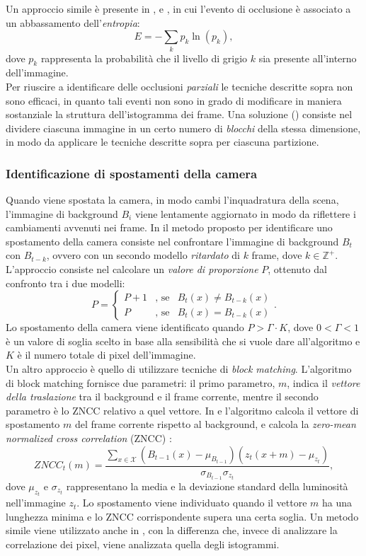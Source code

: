 Un approccio simile \`e presente in \cite{harasse2004automated}, \cite{gil2007automatic} e \cite{ellwart2012camera}, in cui l'evento di occlusione \`e associato a un abbassamento dell'\textit{entropia}:
 \[
 \label{eq:entropy}
 E=-\sum_{k}p_k\ln(p_k) ,
 \]
 dove $p_k$ rappresenta la probabilit\`a che il livello di grigio $k$ sia presente all'interno dell'immagine. \\
 Per riuscire a identificare delle occlusioni \textit{parziali} le tecniche descritte sopra non sono efficaci, in quanto tali eventi non sono in grado di modificare in maniera sostanziale la struttura dell'istogramma dei frame.
 Una soluzione (\cite{gil2007automatic}) consiste nel dividere ciascuna immagine in un certo numero di \textit{blocchi} della stessa dimensione, in modo da applicare le tecniche descritte sopra per ciascuna partizione.
\subsubsection{Identificazione di spostamenti della camera}
Quando viene spostata la camera, in modo cambi l'inquadratura della scena, l'immagine di background $B_i$ viene lentamente aggiornato in modo da riflettere i cambiamenti avvenuti nei frame. 
In \cite{saglam2009real} il metodo proposto per identificare uno spostamento della camera consiste nel confrontare l'immagine di background $B_t$ con $B_{t-k}$, ovvero con un secondo modello \textit{ritardato} di $k$ frame, dove $k \in \mathbb{Z}^+$.
L'approccio consiste nel calcolare un \textit{valore di proporzione} $P$, ottenuto dal confronto tra i due modelli:
\[
\label{eq:displEqSaglam}
P=\left\{ \begin{array} {lcl}
P+1 & \mbox{, se} & B_t(x) \neq B_{t-k}(x) \\
P & \mbox{, se} & B_t(x) = B_{t-k}(x) \end{array} \right. .
\]
Lo spostamento della camera viene identificato quando $P > \Gamma \cdot K$, dove $0<\Gamma<1$ \`e un valore di soglia scelto in base alla sensibilit\`a che si vuole dare all'algoritmo e $K$ \`e il numero totale di pixel dell'immagine.\\
Un altro approccio \`e quello di utilizzare tecniche di \textit{block matching}.
L'algoritmo di block matching fornisce due parametri:
il primo parametro, $m$, indica il \textit{vettore della traslazione} tra il background e il frame corrente, mentre il secondo parametro \`e lo ZNCC relativo a quel vettore.
In \cite{harasse2004automated} e \cite{gil2007automatic} l'algoritmo calcola il vettore di spostamento $m$ del frame corrente rispetto al background, e calcola la \textit{zero-mean normalized cross correlation} (ZNCC) \cite{roma2002comparative}:
\[
ZNCC_t(m) = \frac{\sum_{x \in \mathcal{X}}(B_{t-1}(x)- \mu_{B_{t-1}})(z_t(x+m)-\mu_{z_t})}{\sigma_{B_{t-1}} \sigma_{z_t}},
\]
dove $\mu_{z_t}$ e $\sigma_{z_t}$ rappresentano la media e la deviazione standard della luminosit\`a nell'immagine $z_t$.
Lo spostamento viene individuato quando il vettore $m$ ha una lunghezza minima e lo ZNCC corrispondente supera una certa soglia.
Un metodo simile viene utilizzato anche in \cite{kryjak2012fpga}, con la differenza che, invece di analizzare la correlazione dei pixel, viene analizzata quella degli istogrammi. 
